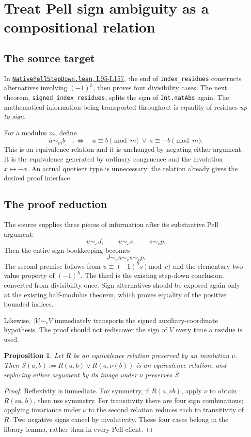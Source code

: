 \documentclass[11pt]{article}
\newtheorem{proposition}[theorem]{Proposition}
\theoremstyle{remark}\newtheorem{remark}[theorem]{Remark}
\newcommand{\code}[1]{\nolinkurl{#1}}
\newcommand{\sref}[2]{\href{https://github.com/VladimirReshetnikov/ProveIt/blob/8e8b5dcb954969621c484588f0b902be1cfea7b3/Computability/DiophantineConsistency/Lean/DiophantineConsistency/#1\##2}{\nolinkurl{#1}, #2}}
\begin{document}
\section{Treat Pell sign ambiguity as a compositional relation}
\label{sec:signed}

\subsection{The source target}

In \sref{NativePellStepDown.lean}{L95-L157}, the end of \code{index_residues} constructs alternatives involving \((-1)^h\), then proves four divisibility cases. The next theorem, \code{signed_index_residues}, splits the sign of \code{Int.natAbs} again. The mathematical information being transported throughout is equality of residues \emph{up to sign}.

For a modulus \(m\), define
\[
 a\sim_m b \quad:\Longleftrightarrow\quad
 a\equiv b\pmod m\ \lor\ a\equiv-b\pmod m.
\]
This is an equivalence relation and it is unchanged by negating either argument. It is the equivalence generated by ordinary congruence and the involution \(x\mapsto-x\). An actual quotient type is unnecessary: the relation already gives the desired proof interface.

\subsection{The proof reduction}

The source supplies three pieces of information after its substantive Pell argument:
\[
 u\sim_c J,\qquad u\sim_c s,\qquad s\sim_c p.
\]
Then the entire sign bookkeeping becomes
\[
 J\sim_c u\sim_c s\sim_c p.
\]
The second premise follows from \(u\equiv(-1)^h s\pmod c\) and the elementary two-value property of \((-1)^h\). The third is the existing step-down conclusion, converted from divisibility once. Sign alternatives should be exposed again only at the existing half-modulus theorem, which proves equality of the positive bounded indices.

Likewise, \(|V|\sim_c V\) immediately transports the signed auxiliary-coordinate hypothesis. The proof should not rediscover the sign of \(V\) every time a residue is used.

\begin{proposition}
Let \(R\) be an equivalence relation preserved by an involution \(\nu\). Then
\(S(a,b):=R(a,b)\lor R(a,\nu(b))\) is an equivalence relation, and replacing either argument by its image under \(\nu\) preserves \(S\).
\end{proposition}
\begin{proof}
Reflexivity is immediate. For symmetry, if \(R(a,\nu b)\), apply \(\nu\) to obtain \(R(\nu a,b)\), then use symmetry. For transitivity there are four sign combinations; applying invariance under \(\nu\) to the second relation reduces each to transitivity of \(R\). Two negative signs cancel by involutivity. These four cases belong in the library lemma, rather than in every Pell client.
\end{proof}
\end{document}
